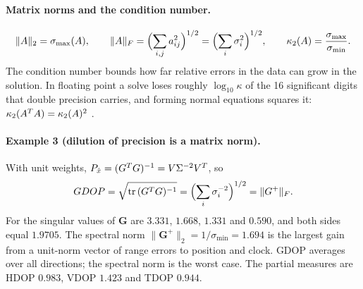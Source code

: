 \documentclass[main.tex]{subfiles}
\begin{document}
\paragraph{Matrix norms and the condition number.}
\begin{equation}
\lVert A\rVert_2 = \sigma_{\max}(A),
\qquad
\lVert A\rVert_F = \Bigl(\sum_{i,j} a_{ij}^2\Bigr)^{1/2}
  = \Bigl(\sum_i \sigma_i^2\Bigr)^{1/2},
\qquad
\kappa_2(A) = \frac{\sigma_{\max}}{\sigma_{\min}}.
\label{eq:la-matnorms}
\end{equation}
The condition number bounds how far relative errors in the data can grow in
the solution.  In floating point a solve loses roughly $\log_{10}\kappa$ of
the 16 significant digits that double precision carries, and forming normal
equations squares it: $\kappa_2(A^{T}A) = \kappa_2(A)^2$
\cite{higham2002accuracy}.

\paragraph{Example 3 (dilution of precision is a matrix norm).}
\label{la:ex3}%
With unit weights, $P_{\hat x} = (G^{T}G)^{-1} =
V\Sigma^{-2}V^{T}$, so
\begin{equation}
GDOP = \sqrt{\operatorname{tr}\,(G^{T}G)^{-1}}
  = \Bigl(\sum_i \sigma_i^{-2}\Bigr)^{1/2}
  = \lVert G^{+}\rVert_F .
\label{eq:la-gdop}
\end{equation}
For  the singular values of $\bm{G}$ are $3.331$,
$1.668$, $1.331$ and $0.590$, and both sides equal $1.9705$.  The spectral
norm $\lVert\bm{G}^{+}\rVert_2 = 1/\sigma_{\min} = 1.694$ is the largest
gain from a unit-norm vector of range errors to position and clock.  GDOP
averages over all directions; the spectral norm is the worst case.  The
partial measures are HDOP $0.983$, VDOP $1.423$ and TDOP $0.944$.
\end{document}
